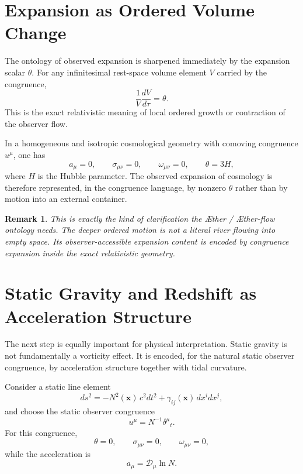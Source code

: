 \documentclass[11pt]{article}
\newcommand{\Aether}{\AE{}ther}
\newcommand{\Aflow}{\AE{}ther-flow}
\newcommand{\Proj}{\mathcal{D}}
\newtheorem{remark}{Remark}
\begin{document}
\section{Expansion as Ordered Volume Change}

The ontology of observed expansion is sharpened immediately by the expansion scalar \(\theta\). For any infinitesimal rest-space volume element \(V\) carried by the congruence,
\begin{equation}
\frac{1}{V}\frac{dV}{d\tau}=\theta.
\label{eq:volumeexpansion}
\end{equation}
This is the exact relativistic meaning of local ordered growth or contraction of the observer flow.

In a homogeneous and isotropic cosmological geometry with comoving congruence \(u^\mu\), one has
\begin{equation}
a_\mu=0,
\qquad
\sigma_{\mu\nu}=0,
\qquad
\omega_{\mu\nu}=0,
\qquad
\theta = 3H,
\label{eq:flrwtheta}
\end{equation}
where \(H\) is the Hubble parameter. The observed expansion of cosmology is therefore represented, in the congruence language, by nonzero \(\theta\) rather than by motion into an external container.

\begin{remark}
This is exactly the kind of clarification the \Aether{} / \Aflow{} ontology needs. The deeper ordered motion is not a literal river flowing into empty space. Its observer-accessible expansion content is encoded by congruence expansion inside the exact relativistic geometry.
\end{remark}

\section{Static Gravity and Redshift as Acceleration Structure}

The next step is equally important for physical interpretation. Static gravity is not fundamentally a vorticity effect. It is encoded, for the natural static observer congruence, by acceleration structure together with tidal curvature.

Consider a static line element
\begin{equation}
ds^2
=
-N^2(\mathbf{x})\,c^2dt^2
+
\gamma_{ij}(\mathbf{x})\,dx^i dx^j,
\label{eq:staticmetric}
\end{equation}
and choose the static observer congruence
\begin{equation}
u^\mu = N^{-1}\delta^\mu{}_t.
\label{eq:staticu}
\end{equation}
For this congruence,
\begin{equation}
\theta=0,
\qquad
\sigma_{\mu\nu}=0,
\qquad
\omega_{\mu\nu}=0,
\label{eq:statickinematics}
\end{equation}
while the acceleration is
\begin{equation}
a_\mu = \Proj_\mu \ln N.
\label{eq:staticacceleration}
\end{equation}
\end{document}
